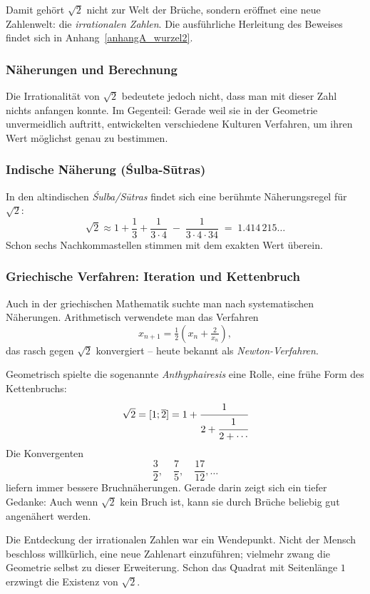 Damit gehört $\sqrt{2}$ nicht zur Welt der Brüche,
sondern eröffnet eine neue Zahlenwelt:
die \emph{irrationalen Zahlen}.
Die ausführliche Herleitung des Beweises findet sich in
Anhang~\ref{anhangA_wurzel2}.


\subsubsection*{Näherungen und Berechnung}
Die Irrationalität von $\sqrt{2}$ bedeutete jedoch nicht,
dass man mit dieser Zahl nichts anfangen konnte.
Im Gegenteil:
Gerade weil sie in der Geometrie unvermeidlich auftritt,
entwickelten verschiedene Kulturen Verfahren,
um ihren Wert möglichst genau zu bestimmen.

\subsubsection*{Indische Näherung (Śulba-Sūtras)}
In den altindischen \emph{Śulba\-/Sūtras}
findet sich eine berühmte Näherungsregel für $\sqrt{2}$:
\[
\sqrt{2}\approx 1+\frac{1}{3}+\frac{1}{3\cdot 4}\;-\;\frac{1}{3\cdot 4\cdot 34}
\;=\;1.414\,215\ldots
\]
Schon sechs Nachkommastellen stimmen mit dem exakten Wert überein.

\subsubsection*{Griechische Verfahren: Iteration und Kettenbruch}
Auch in der griechischen Mathematik suchte man nach systematischen Näherungen.
Arithmetisch verwendete man das Verfahren
\[
x_{n+1}=\tfrac{1}{2}\left(x_n+\tfrac{2}{x_n}\right),
\]
das rasch gegen $\sqrt{2}$ konvergiert --
heute bekannt als \emph{Newton-Verfahren}.

Geometrisch spielte die sogenannte \emph{Anthyphairesis} eine Rolle,
eine frühe Form des Kettenbruchs:
\[
\sqrt{2}=[1;\overline{2}]
=1+\cfrac{1}{2+\cfrac{1}{2+\cdots}}
\]
Die Konvergenten
\[
\frac{3}{2},\quad \frac{7}{5},\quad \frac{17}{12},\dots
\]
liefern immer bessere Bruchnäherungen.
Gerade darin zeigt sich ein tiefer Gedanke:
Auch wenn $\sqrt{2}$ kein Bruch ist,
kann sie durch Brüche beliebig gut angenähert werden.

\begin{NoteBox}
	Die Entdeckung der irrationalen Zahlen war ein Wendepunkt.
	Nicht der Mensch beschloss willkürlich,
	eine neue Zahlenart einzuführen;
	vielmehr zwang die Geometrie selbst zu dieser Erweiterung.
	Schon das Quadrat mit Seitenlänge $1$
	erzwingt die Existenz von $\sqrt{2}$.
	\label{box:mathentdeckung}
\end{NoteBox}

